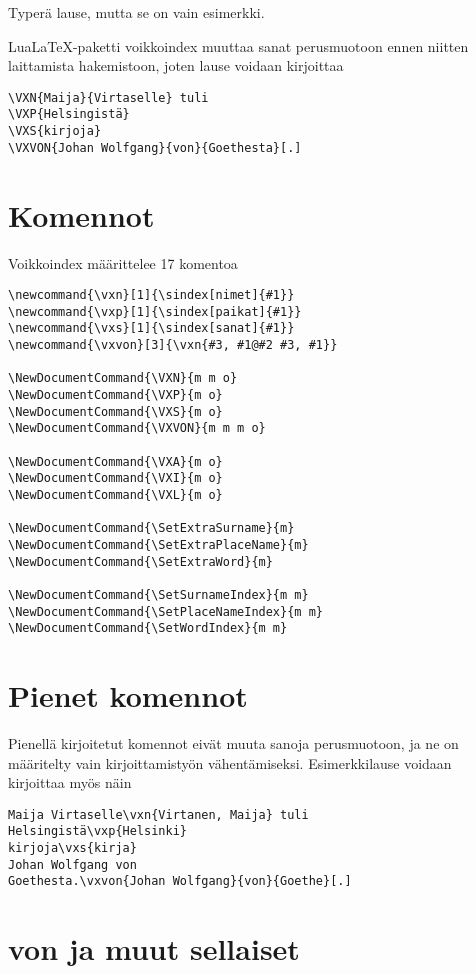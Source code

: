 \documentclass[12pt]{article}
\begin{document}
Typerä lause, mutta se on vain esimerkki.

LuaLaTeX-paketti voikkoindex muuttaa sanat perusmuotoon ennen niitten
laittamista hakemistoon, joten lause voidaan kirjoittaa

\begin{verbatim}
\VXN{Maija}{Virtaselle} tuli
\VXP{Helsingistä}
\VXS{kirjoja}
\VXVON{Johan Wolfgang}{von}{Goethesta}[.]
\end{verbatim}


\section*{Komennot}

Voikkoindex määrittelee 17 komentoa

\begin{verbatim}
\newcommand{\vxn}[1]{\sindex[nimet]{#1}}
\newcommand{\vxp}[1]{\sindex[paikat]{#1}}
\newcommand{\vxs}[1]{\sindex[sanat]{#1}}
\newcommand{\vxvon}[3]{\vxn{#3, #1@#2 #3, #1}}

\NewDocumentCommand{\VXN}{m m o}
\NewDocumentCommand{\VXP}{m o}
\NewDocumentCommand{\VXS}{m o}
\NewDocumentCommand{\VXVON}{m m m o}

\NewDocumentCommand{\VXA}{m o}
\NewDocumentCommand{\VXI}{m o}
\NewDocumentCommand{\VXL}{m o}

\NewDocumentCommand{\SetExtraSurname}{m}
\NewDocumentCommand{\SetExtraPlaceName}{m}
\NewDocumentCommand{\SetExtraWord}{m}

\NewDocumentCommand{\SetSurnameIndex}{m m}
\NewDocumentCommand{\SetPlaceNameIndex}{m m}
\NewDocumentCommand{\SetWordIndex}{m m}
\end{verbatim}


\section*{Pienet komennot}

Pienellä kirjoitetut komennot eivät muuta sanoja perusmuotoon, ja ne
on määritelty vain kirjoittamistyön vähentämiseksi. Esimerkkilause
voidaan kirjoittaa myös näin

\begin{verbatim}
Maija Virtaselle\vxn{Virtanen, Maija} tuli
Helsingistä\vxp{Helsinki}
kirjoja\vxs{kirja}
Johan Wolfgang von
Goethesta.\vxvon{Johan Wolfgang}{von}{Goethe}[.]
\end{verbatim}


\section*{von ja muut sellaiset}
\end{document}
